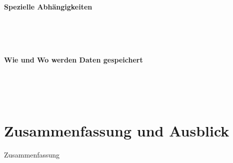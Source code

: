 \begin{description}
	\item[\textbf{Spezielle Abhängigkeiten}]\hfill \\  \\ \\
	\item[\textbf{Wie und Wo werden Daten gespeichert}]\hfill \\  \\ \\
\end{description}

\section{Zusammenfassung und Ausblick}

Zusammenfassung

